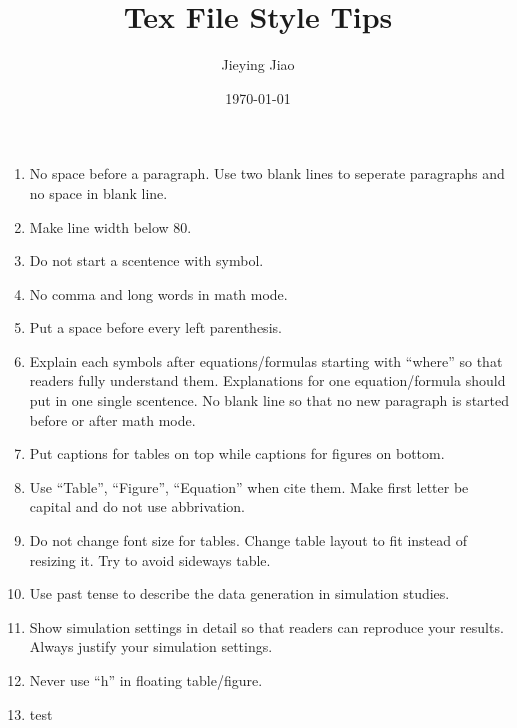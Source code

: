 \documentclass[12pt, letterpaper]{article}
\title{Tex File Style Tips}
\author{Jieying Jiao}
\date{\today}
\begin{document}
\maketitle
\begin{enumerate}
    \item No space before a paragraph. Use two blank lines to seperate paragraphs 
    and no space in blank line.
    \item Make line width below 80. 
    \item Do not start a scentence with symbol.
    \item No comma and long words in math mode.
    \item Put a space before every left parenthesis.
    \item Explain each symbols after equations/formulas starting with ``where'' 
    so that readers fully understand them. Explanations for one equation/formula 
    should put in one single scentence. No blank line so that no new paragraph 
    is started before or after math mode.
    \item Put captions for tables on top while captions for figures on bottom.
    \item Use ``Table'', ``Figure'', ``Equation'' when cite them. Make first letter 
    be capital and do not use abbrivation.
    \item Do not change font size for tables. Change table layout to fit instead 
    of resizing it. Try to avoid sideways table.
    \item Use past tense to describe the data generation in simulation studies.
    \item Show simulation settings in detail so that readers can reproduce your 
    results. Always justify your simulation settings.
    \item Never use ``h'' in floating table/figure.
    \item test
\end{enumerate}
\end{document}
